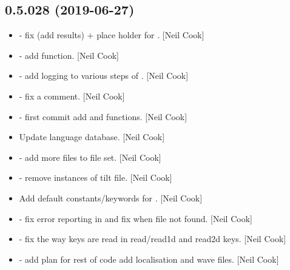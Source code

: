 \documentclass[a4paper,10pt,english]{report}
\begin{document}
\subsection{0.5.028 (2019-06-27)}
\label{\detokenize{misc/changelog:id109}}\begin{itemize}
\item {} 
 - fix  (add 
results) + place holder for . {[}Neil Cook{]}

\item {} 
 - add  function. {[}Neil
Cook{]}

\item {} 
 - add logging to various steps of
. {[}Neil Cook{]}

\item {} 
 - fix a comment. {[}Neil Cook{]}

\item {} 
 - first commit add  and
 functions. {[}Neil Cook{]}

\item {} 
Update language database. {[}Neil Cook{]}

\item {} 
 - add more files to  file set. {[}Neil Cook{]}

\item {} 
 - remove instances of tilt file. {[}Neil Cook{]}

\item {} 
Add default constants/keywords for . {[}Neil Cook{]}

\item {} 
 - fix error reporting in  and fix
 when file not found. {[}Neil Cook{]}

\item {} 
 - fix the way keys are read in read/read1d and read2d
keys. {[}Neil Cook{]}

\item {} 
 - add plan for rest of code add
localisation and wave files. {[}Neil Cook{]}


\end{itemize}
\end{document}
